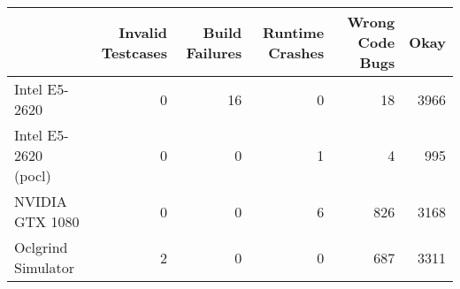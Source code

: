 \begin{tabular}{lrrrrr}
\toprule
{} &  Invalid Testcases &  Build Failures &  Runtime Crashes &  Wrong Code Bugs &  Okay \\
\midrule
Intel E5-2620        &                  0 &              16 &                0 &               18 &  3966 \\
Intel E5-2620 (pocl) &                  0 &               0 &                1 &                4 &   995 \\
NVIDIA GTX 1080      &                  0 &               0 &                6 &              826 &  3168 \\
Oclgrind Simulator   &                  2 &               0 &                0 &              687 &  3311 \\
\bottomrule
\end{tabular}

